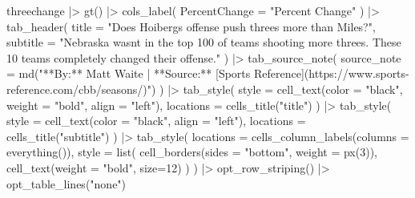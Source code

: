 \documentclass[
  letterpaper,
  DIV=11,
  numbers=noendperiod]{scrreprt}
\newenvironment{Shaded}{\begin{snugshade}}{\end{snugshade}}
\newcommand{\AttributeTok}[1]{\textcolor[rgb]{0.40,0.45,0.13}{#1}}
\newcommand{\DecValTok}[1]{\textcolor[rgb]{0.68,0.00,0.00}{#1}}
\newcommand{\FunctionTok}[1]{\textcolor[rgb]{0.28,0.35,0.67}{#1}}
\newcommand{\NormalTok}[1]{\textcolor[rgb]{0.00,0.23,0.31}{#1}}
\newcommand{\SpecialCharTok}[1]{\textcolor[rgb]{0.37,0.37,0.37}{#1}}
\newcommand{\StringTok}[1]{\textcolor[rgb]{0.13,0.47,0.30}{#1}}
\begin{document}
\begin{Shaded}
\begin{Highlighting}[]
\NormalTok{threechange }\SpecialCharTok{|\textgreater{}} 
  \FunctionTok{gt}\NormalTok{() }\SpecialCharTok{|\textgreater{}} 
  \FunctionTok{cols\_label}\NormalTok{(}
    \AttributeTok{PercentChange =} \StringTok{"Percent Change"}
\NormalTok{  ) }\SpecialCharTok{|\textgreater{}}
  \FunctionTok{tab\_header}\NormalTok{(}
    \AttributeTok{title =} \StringTok{"Does Hoiberg\textquotesingle{}s offense push threes more than Miles?"}\NormalTok{,}
    \AttributeTok{subtitle =} \StringTok{"Nebraska wasn\textquotesingle{}t in the top 100 of teams shooting more threes. These 10 teams completely changed their offense."}
\NormalTok{  ) }\SpecialCharTok{|\textgreater{}}  
  \FunctionTok{tab\_source\_note}\NormalTok{(}
    \AttributeTok{source\_note =} \FunctionTok{md}\NormalTok{(}\StringTok{"**By:** Matt Waite  |  **Source:** [Sports Reference](https://www.sports{-}reference.com/cbb/seasons/)"}\NormalTok{)}
\NormalTok{  ) }\SpecialCharTok{|\textgreater{}} 
  \FunctionTok{tab\_style}\NormalTok{(}
    \AttributeTok{style =} \FunctionTok{cell\_text}\NormalTok{(}\AttributeTok{color =} \StringTok{"black"}\NormalTok{, }\AttributeTok{weight =} \StringTok{"bold"}\NormalTok{, }\AttributeTok{align =} \StringTok{"left"}\NormalTok{),}
    \AttributeTok{locations =} \FunctionTok{cells\_title}\NormalTok{(}\StringTok{"title"}\NormalTok{)}
\NormalTok{  ) }\SpecialCharTok{|\textgreater{}} 
  \FunctionTok{tab\_style}\NormalTok{(}
    \AttributeTok{style =} \FunctionTok{cell\_text}\NormalTok{(}\AttributeTok{color =} \StringTok{"black"}\NormalTok{, }\AttributeTok{align =} \StringTok{"left"}\NormalTok{),}
    \AttributeTok{locations =} \FunctionTok{cells\_title}\NormalTok{(}\StringTok{"subtitle"}\NormalTok{)}
\NormalTok{  ) }\SpecialCharTok{|\textgreater{}}
  \FunctionTok{tab\_style}\NormalTok{(}
     \AttributeTok{locations =} \FunctionTok{cells\_column\_labels}\NormalTok{(}\AttributeTok{columns =} \FunctionTok{everything}\NormalTok{()),}
     \AttributeTok{style =} \FunctionTok{list}\NormalTok{(}
       \FunctionTok{cell\_borders}\NormalTok{(}\AttributeTok{sides =} \StringTok{"bottom"}\NormalTok{, }\AttributeTok{weight =} \FunctionTok{px}\NormalTok{(}\DecValTok{3}\NormalTok{)),}
       \FunctionTok{cell\_text}\NormalTok{(}\AttributeTok{weight =} \StringTok{"bold"}\NormalTok{, }\AttributeTok{size=}\DecValTok{12}\NormalTok{)}
\NormalTok{     )}
\NormalTok{   ) }\SpecialCharTok{|\textgreater{}}
  \FunctionTok{opt\_row\_striping}\NormalTok{() }\SpecialCharTok{|\textgreater{}} 
  \FunctionTok{opt\_table\_lines}\NormalTok{(}\StringTok{"none"}\NormalTok{)}
\end{Highlighting}
\end{Shaded}
\end{document}
